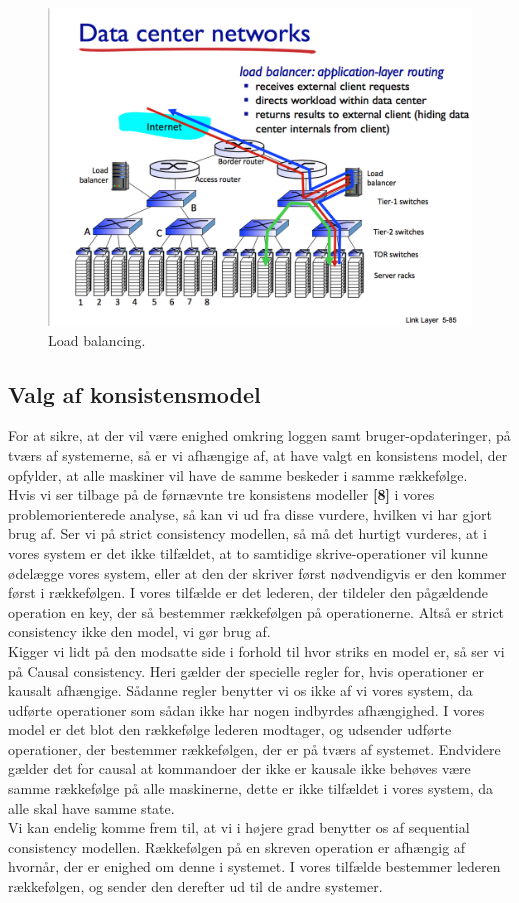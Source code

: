 \documentclass[a4paper,12pt]{article}
\begin{document}
\begin{figure}[H]
  \caption{Load balancing.}
  \centering
    \includegraphics[width=1\textwidth]{Loadbalancing}
\end{figure}

\subsection{Valg af konsistensmodel}
For at sikre, at der vil være enighed omkring loggen samt bruger-opdateringer, på tværs af systemerne, så er vi afhængige af, at have valgt en konsistens model, der opfylder, at alle maskiner vil have de samme beskeder i samme rækkefølge.
\\[5px]
Hvis vi ser tilbage på de førnævnte tre konsistens modeller \textbf{[8]} i vores problemorienterede analyse, så kan vi ud fra disse vurdere, hvilken vi har gjort brug af.
Ser vi på strict consistency modellen, så må det hurtigt vurderes, at i vores system er det ikke tilfældet, at to samtidige skrive-operationer vil kunne ødelægge vores system, eller at den der skriver først nødvendigvis er den kommer først i rækkefølgen. I vores tilfælde er det lederen, der tildeler den pågældende operation en key, der så bestemmer rækkefølgen på operationerne.
Altså er strict consistency ikke den model, vi gør brug af.
\\[5px]
Kigger vi lidt på den modsatte side i forhold til hvor striks en model er, så ser vi på Causal consistency. Heri gælder der specielle regler for, hvis operationer er kausalt afhængige. Sådanne regler benytter vi os ikke af vi vores system, da udførte operationer som sådan ikke har nogen indbyrdes afhængighed. I vores model er det blot den rækkefølge lederen modtager, og udsender udførte operationer, der bestemmer rækkefølgen, der er på tværs af systemet.
Endvidere gælder det for causal at kommandoer der ikke er kausale ikke behøves være samme rækkefølge på alle maskinerne, dette er ikke tilfældet i vores system, da alle skal have samme state.
\\[5px]
Vi kan endelig komme frem til, at vi i højere grad benytter os af sequential consistency modellen. Rækkefølgen på en skreven operation er afhængig af hvornår, der er enighed om denne i systemet. I vores tilfælde bestemmer lederen rækkefølgen, og sender den derefter ud til de andre systemer.
\end{document}

